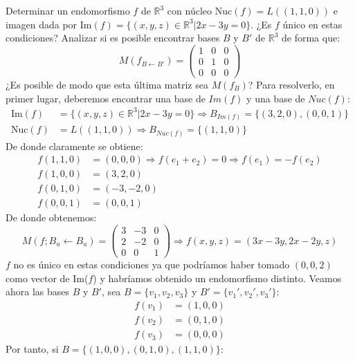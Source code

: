 \begin{ejercicio}
	Determinar un endomorfismo \( f \) de \( \mathbb{R}^3 \) con núcleo \( \text{Nuc}(f) = L((1,1,0)) \) e imagen dada por \( \text{Im}(f) = \{(x,y,z) \in \mathbb{R}^3 | 2x - 3y = 0\} \). ¿Es \( f \) único en estas condiciones? Analizar si es posible encontrar bases \( B \) y \( B' \) de \( \mathbb{R}^3 \) de forma que:
	\[ M(f_{B \leftarrow B'}) = \begin{pmatrix} 1 & 0 & 0 \\ 0 & 1 & 0 \\ 0 & 0 & 0 \end{pmatrix} \]
	¿Es posible de modo que esta última matriz sea \( M(f_B) \)?
	Para resolverlo, en primer lugar, deberemos encontrar una base de $Im(f)$ y una base de $Nuc(f)$:
	\begin{align*}
		\text{Im}(f)  & = \{(x,y,z) \in \mathbb{R}^3 | 2x - 3y = 0\} \Rightarrow B_{Im(f)} = \{(3,2,0),(0,0,1)\} \\
		\text{Nuc}(f) & = L((1,1,0)) \Rightarrow B_{Nuc(f)} = \{(1,1,0)\}
	\end{align*}
	De donde claramente se obtiene:
	\begin{align*}
		f(1,1,0) & = (0,0,0) \Rightarrow f(e_1+e_2) = 0 \Rightarrow f(e_1) = -f(e_2) \\
		f(1,0,0) & = (3,2,0)                                                         \\
		f(0,1,0) & = (-3,-2,0)                                                       \\
		f(0,0,1) & = (0,0,1)
	\end{align*}
	De donde obtenemos:
	\begin{equation*}
		M(f;B_u \leftarrow B_u) = \begin{pmatrix}
			3 & -3 & 0 \\
			2 & -2 & 0 \\
			0 & 0  & 1
		\end{pmatrix} \Rightarrow f(x,y,z) = (3x-3y,2x-2y,z)
	\end{equation*}
	$f$ no es único en estas condiciones ya que podríamos haber tomado $(0,0,2)$ como vector de Im($f$) y habríamos
	obtenido un endomorfismo distinto. Veamos ahora las bases $B$ y $B'$, sea $B = \{v_1,v_2,v_3\}$ y $B' = \{v_1',v_2',v_3'\}$:
	\begin{align*}
		f(v_1) & = (1,0,0) \\
		f(v_2) & = (0,1,0) \\
		f(v_3) & = (0,0,0)
	\end{align*}
	Por tanto, si $B = \{(1,0,0),(0,1,0),(1,1,0)\}$:

\end{ejercicio}
